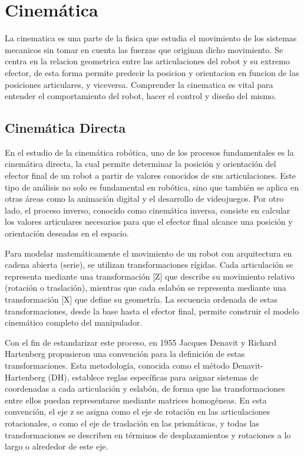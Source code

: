 \section{Cinemática} \label{sec:cinematica}

La cinematica es una parte de la fisica que estudia el movimiento de los sistemas mecanicos sin tomar en cuenta las fuerzas que originan dicho movimiento. Se centra en la relacion geometrica entre las articulaciones del robot y su extremo efector, de esta forma permite predecir la posicion y orientacion en funcion de las posiciones articulares, y viceversa. Comprender la cinematica es vital para entender el comportamiento del robot, hacer el control y diseño del mismo. 

\subsection{Cinemática Directa}
En el estudio de la cinemática robótica, uno de los procesos fundamentales es la cinemática directa, la cual permite determinar la posición y orientación del efector final de un robot a partir de valores conocidos de sus articulaciones. Este tipo de análisis no solo es fundamental en robótica, sino que también se aplica en otras áreas como la animación digital y el desarrollo de videojuegos. Por otro lado, el proceso inverso, conocido como cinemática inversa, consiste en calcular los valores articulares necesarios para que el efector final alcance una posición y orientación deseadas en el espacio.

Para modelar matemáticamente el movimiento de un robot con arquitectura en cadena abierta (serie), se utilizan transformaciones rígidas. Cada articulación se representa mediante una transformación [Z] que describe su movimiento relativo (rotación o traslación), mientras que cada eslabón se representa mediante una transformación [X] que define su geometría. La secuencia ordenada de estas transformaciones, desde la base hasta el efector final, permite construir el modelo cinemático completo del manipulador.

Con el fin de estandarizar este proceso, en 1955 Jacques Denavit y Richard Hartenberg propusieron una convención para la definición de estas transformaciones. Esta metodología, conocida como el método Denavit-Hartenberg (DH), establece reglas específicas para asignar sistemas de coordenadas a cada articulación y eslabón, de forma que las transformaciones entre ellos puedan representarse mediante matrices homogéneas. En esta convención, el eje z se asigna como el eje de rotación en las articulaciones rotacionales, o como el eje de traslación en las prismáticas, y todas las transformaciones se describen en términos de desplazamientos y rotaciones a lo largo o alrededor de este eje.

